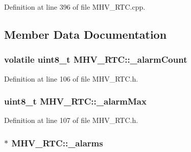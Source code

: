 \-Definition at line 396 of file \-M\-H\-V\-\_\-\-R\-T\-C.\-cpp.



\subsection{\-Member \-Data \-Documentation}
\hypertarget{class_m_h_v___r_t_c_a953a79952c9fa5fde5d1dacbc03d3b46}{
\subsubsection[{\-\_\-alarm\-Count}]{\setlength{\rightskip}{0pt plus 5cm}volatile uint8\-\_\-t {\bf \-M\-H\-V\-\_\-\-R\-T\-C\-::\-\_\-alarm\-Count}}}
\label{class_m_h_v___r_t_c_a953a79952c9fa5fde5d1dacbc03d3b46}


\-Definition at line 106 of file \-M\-H\-V\-\_\-\-R\-T\-C.\-h.

\hypertarget{class_m_h_v___r_t_c_aed7d37466a99362b78dd9ccf1390d35c}{
\subsubsection[{\-\_\-alarm\-Max}]{\setlength{\rightskip}{0pt plus 5cm}uint8\-\_\-t {\bf \-M\-H\-V\-\_\-\-R\-T\-C\-::\-\_\-alarm\-Max}}}
\label{class_m_h_v___r_t_c_aed7d37466a99362b78dd9ccf1390d35c}


\-Definition at line 107 of file \-M\-H\-V\-\_\-\-R\-T\-C.\-h.

\hypertarget{class_m_h_v___r_t_c_afaaed6deea21b52f8bde5f8ebc0abf70}{
\subsubsection[{\-\_\-alarms}]{$\ast$ {\bf \-M\-H\-V\-\_\-\-R\-T\-C\-::\-\_\-alarms}}}
\label{class_m_h_v___r_t_c_afaaed6deea21b52f8bde5f8ebc0abf70}


